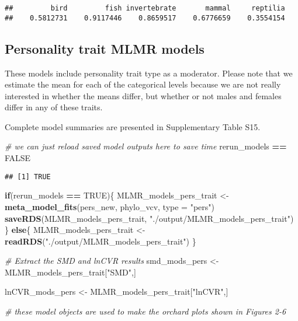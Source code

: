\documentclass[]{article}
\newenvironment{Shaded}{\begin{snugshade}}{\end{snugshade}}
\newcommand{\KeywordTok}[1]{\textcolor[rgb]{0.13,0.29,0.53}{\textbf{#1}}}
\newcommand{\DataTypeTok}[1]{\textcolor[rgb]{0.13,0.29,0.53}{#1}}
\newcommand{\StringTok}[1]{\textcolor[rgb]{0.31,0.60,0.02}{#1}}
\newcommand{\CommentTok}[1]{\textcolor[rgb]{0.56,0.35,0.01}{\textit{#1}}}
\newcommand{\OtherTok}[1]{\textcolor[rgb]{0.56,0.35,0.01}{#1}}
\newcommand{\ControlFlowTok}[1]{\textcolor[rgb]{0.13,0.29,0.53}{\textbf{#1}}}
\newcommand{\OperatorTok}[1]{\textcolor[rgb]{0.81,0.36,0.00}{\textbf{#1}}}
\newcommand{\NormalTok}[1]{#1}
\begin{document}
\begin{verbatim}
##         bird         fish invertebrate       mammal     reptilia 
##    0.5812731    0.9117446    0.8659517    0.6776659    0.3554154
\end{verbatim}

\subsection{Personality trait MLMR
models}\label{personality-trait-mlmr-models}

These models include personality trait type as a moderator. Please note
that we estimate the mean for each of the categorical levels because we
are not really interested in whether the means differ, but whether or
not males and females differ in any of these traits.

Complete model summaries are presented in Supplementary Table S15.

\begin{Shaded}
\begin{Highlighting}[]
\CommentTok{# we can just reload saved model outputs here to save time}
\NormalTok{rerun_models }\OperatorTok{==}\StringTok{ }\OtherTok{FALSE}
\end{Highlighting}
\end{Shaded}

\begin{verbatim}
## [1] TRUE
\end{verbatim}

\begin{Shaded}
\begin{Highlighting}[]
    \ControlFlowTok{if}\NormalTok{(rerun_models }\OperatorTok{==}\StringTok{ }\OtherTok{TRUE}\NormalTok{)\{}
\NormalTok{      MLMR_models_pers_trait <-}\StringTok{ }\KeywordTok{meta_model_fits}\NormalTok{(pers_new, phylo_vcv, }\DataTypeTok{type =} \StringTok{"pers"}\NormalTok{)}
      \KeywordTok{saveRDS}\NormalTok{(MLMR_models_pers_trait, }\StringTok{"./output/MLMR_models_pers_trait"}\NormalTok{)}
\NormalTok{    \} }\ControlFlowTok{else}\NormalTok{\{}
\NormalTok{      MLMR_models_pers_trait <-}\StringTok{ }\KeywordTok{readRDS}\NormalTok{(}\StringTok{"./output/MLMR_models_pers_trait"}\NormalTok{)}
\NormalTok{    \}}

  \CommentTok{# Extract the SMD and lnCVR results}
\NormalTok{  smd_mods_pers <-}\StringTok{ }\NormalTok{MLMR_models_pers_trait[}\StringTok{"SMD"}\NormalTok{,]}
     
\NormalTok{  lnCVR_mods_pers <-}\StringTok{ }\NormalTok{MLMR_models_pers_trait[}\StringTok{"lnCVR"}\NormalTok{,] }
     
  \CommentTok{# these model objects are used to make the orchard plots shown in Figures 2-6}
\end{Highlighting}
\end{Shaded}
\end{document}
